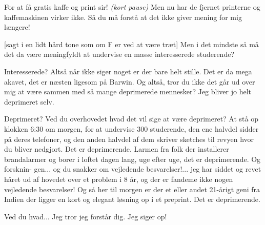 \documentclass[a4paper,11pt]{article}
\begin{document}
\begin{sketch}

For at få gratis kaffe og print sir! \emph{(kort pause)} Men nu har de fjernet printerne og kaffemaskinen virker ikke. Så du må forstå at det ikke giver mening for mig længere!

[sagt i en lidt hård tone som om F er ved at være træt] Men i det mindste så må det da være meningfyldt at undervise en masse interesserede studerende?

 Interesserede? Altså når ikke siger noget er der bare helt stille. Det er da mega akavet, det er næsten ligesom på Barwin. Og altså, tror du ikke det går ud over mig at være sammen med så mange deprimerede mennesker? Jeg bliver jo helt deprimeret selv.


 Deprimeret? Ved du overhovedet hvad det vil sige at være deprimeret?
At stå op klokken 6:30 om morgen, for at undervise 300 studerende, den ene halvdel sidder på deres telefoner, og den anden halvdel af dem skriver sketches til revyen hvor du bliver nedgjort. Det er deprimerende. Larmen fra folk der installerer brandalarmer og borer i loftet dagen lang, uge efter uge, det er deprimerende. Og forsknin-
gen... og du snakker om vejledende besvarelser!... jeg har siddet og revet håret ud af hovedet over et problem i 8 år, og der er fandeme ikke nogen vejledende besvarelser! Og så her til morgen er der et eller andet 21-årigt geni fra Indien der ligger en kort og elegant løsning op i et preprint. Det er deprimerende.


 Ved du hvad... Jeg tror jeg forstår dig. Jeg siger op!

\end{sketch}
\end{document}
